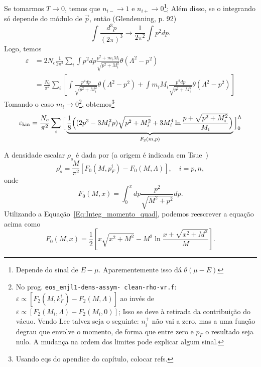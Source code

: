 Se tomarmos $T \to 0$, temos que $n_{i-} \to 1$ e $n_{i+} \to 0$\footnote{Depende do sinal de $E - \mu$. Aparementemente isso dá $\theta(\mu-E)$}; Além disso, se o integrando só depende do módulo de $\vec{p}$, então (Glendenning\cite{Glendenning}, p. 92)
\begin{equation}\label{Eq:Int_d3p_to_dp}
	\int\frac{d^3p}{(2\pi)^3} \to \frac{1}{2\pi^2}\int p^2dp.
\end{equation}
%
Logo, temos
\begin{align}
	\varepsilon &= 2 N_c \frac{1}{2\pi^2}\sum_i \int p^2 dp \frac{p^2 + m_i M_i}{\sqrt{p^2 + M_i^2}} \theta(\Lambda^2 - p^2) \\
	&= \frac{N_c}{\pi^2}\sum_i\left[\int \frac{p^4dp}{\sqrt{p^2 + M_i^2}}\theta(\Lambda^2 - p^2) + \int m_i M_i \frac{p^2 dp}{\sqrt{p^2 + M_i^2}}\theta(\Lambda^2 - p^2)\right] \label{Eq:Engergia_cin_separada}
\end{align}
%
Tomando o caso $m_i \to 0$\footnote{No prog. \texttt{eos\_enjl1-dens-assym- clean-rho-vr.f}: $\varepsilon \propto [F_2(M, k_F^i) - F_2(M, \Lambda)]$ ao invés de $\varepsilon \propto [F_2(M_i, \Lambda) - F_2(M_i, 0)]$; Isso se deve à retirada da contribuição do vácuo. Vendo Lee \etal talvez seja o seguinte: $n_i^+$ não vai a zero, mas a uma função degrau que envolve o momento, de forma que entre zero e $p_F$ o resultado seja nulo. A mudança na ordem dos limites pode explicar algum sinal.}, obtemos\footnote{Usando eqs do apendice do capítulo, colocar refs.}
\begin{equation}\label{Eq:Energia_kin}
	\varepsilon_{\rm{kin}} = \frac{N_c}{\pi^2}\sum_i \Big[\underbrace{\frac{1}{8}\Big((2p^3 - 3M_i^2p)\sqrt{p^2 + M_i^2} + 3M_i^4\ln\frac{p + \sqrt{p^2 + M_i^2}}{M_i}\Big)}_{F_2(m,p)}\Big]_0^\Lambda
\end{equation}

A densidade escalar $\rho_s$ é dada por (a origem é indicada em Tsue~\cite{japoneses})
\begin{equation}\label{Eq:Dens_Escalar}
	\rho_s^i = \frac{M}{\pi^2}[F_0(M, p_F^i) - F_0(M, \Lambda)], \quad i = p, n,
\end{equation}
%
onde
\begin{equation}\label{Eq:Def_F0}
	F_0(M, x) = \int_0^x dp\frac{p^2}{\sqrt{M^2 + p^2}} dp.
\end{equation}
%
Utilizando a Equação~\eqref{Eq:Integ_momento_quad}, podemos reescrever a equação acima como
\begin{equation}\label{Eq:Def_F0_integrado}
	F_0(M, x) = \frac{1}{2}\left[x\sqrt{x^2+M^2} - M^2 \ln \frac{x + \sqrt{x^2+M^2}}{M}\right].
\end{equation}


